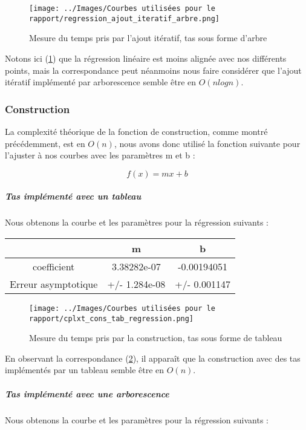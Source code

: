 \documentclass[12pt,a4paper]{article}
\begin{document}
\begin{figure}[hbtp]
\centering
\texttt{[image: ../Images/Courbes utilisées pour le rapport/regression\_ajout\_iteratif\_arbre.png]}
\caption{Mesure du temps pris par l'ajout itératif, tas sous forme d'arbre}
\label{fig2}
\end{figure}

Notons ici (\ref{fig2}) que la régression linéaire est moins alignée avec nos différents points, mais la correspondance peut néanmoins nous faire considérer que l'ajout itératif implémenté par arborescence semble être en $O(n log n)$.




\subsubsection{Construction}

La complexité théorique de la fonction de construction, comme montré précédemment, est en $O(n)$, nous avons donc utilisé la fonction suivante pour l'ajuster à nos courbes avec les paramètres m et b : 

$$
f(x) = mx +b
$$

\subparagraph{Tas implémenté avec un tableau}

Nous obtenons la courbe et les paramètres pour la régression suivants : 

\begin{center}
\begin{tabular}{|c|c|c|}
\hline
 & m & b \\
\hline
coefficient & 3.38282e-07 & -0.00194051 \\
Erreur asymptotique & +/- 1.284e-08 & +/- 0.001147  \\
\hline
\end{tabular}
\end{center}


\begin{figure}[hbtp]
\centering
\texttt{[image: ../Images/Courbes utilisées pour le rapport/cplxt\_cons\_tab\_regression.png]}
\caption{Mesure du temps pris par la construction, tas sous forme de tableau}
\label{fig3}
\end{figure}

En observant la correspondance (\ref{fig3}), il apparaît que la construction avec des tas implémentés par un tableau semble être en $O(n)$.


\subparagraph{Tas implémenté avec une arborescence}

Nous obtenons la courbe et les paramètres pour la régression suivants : 
\end{document}

